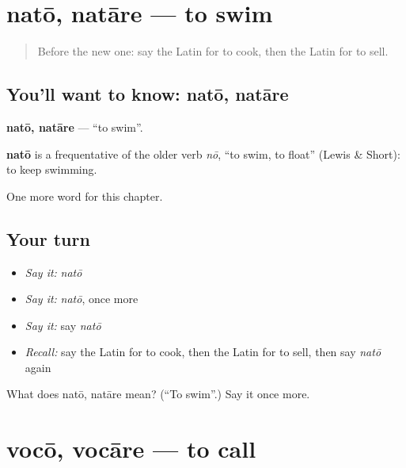 \section[natō, natāre]{natō, natāre — to swim}

\label{lesson:LA-C76-nato}



\begin{quote}
Before the new one: say the Latin for to cook, then the Latin for to sell.
\end{quote}

\subsection*{You'll want to know: natō, natāre}
\textbf{natō, natāre} — \textquotedblleft{}to swim\textquotedblright{}.

\begin{cousinweb}
\textbf{natō} is a frequentative of the older verb \emph{nō}, \textquotedblleft{}to swim, to float\textquotedblright{} (Lewis \& Short): to keep swimming.
\end{cousinweb}

\begin{grammarlens}[title={What you've built}]
One more word for this chapter.
\end{grammarlens}

\subsection*{Your turn}
\begin{itemize}
\raggedright
  \item \emph{Say it:} \emph{natō}
  \item \emph{Say it:} \emph{natō}, once more
  \item \emph{Say it:} say \emph{natō}
  \item \emph{Recall:} say the Latin for to cook, then the Latin for to sell, then say \emph{natō} again
\end{itemize}

\begin{tcolorbox}[breakable,colback=teal!4,colframe=teal!35!black,title={Before you move on}]
What does natō, natāre mean? (\textquotedblleft{}To swim\textquotedblright{}.) Say it once more.
\end{tcolorbox}
\section[vocō, vocāre]{vocō, vocāre — to call}

